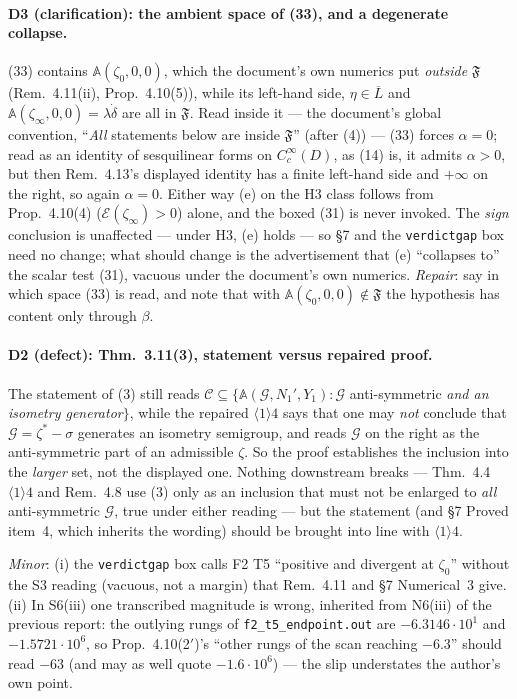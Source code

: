 \documentclass[11pt]{article}
\newcommand{\Aop}{\mathbb A}
\begin{document}
\paragraph{D3 (clarification): the ambient space of (33), and a degenerate collapse.}
(33) contains $\Aop(\zeta_0,0,0)$, which the document's own numerics put \emph{outside}
$\mathfrak F$ (Rem.~4.11(ii), Prop.~4.10(5)), while its left-hand side, $\eta\in\overline L$
and $\Aop(\zeta_\infty,0,0)=\lambda\dot\delta$ are all in $\mathfrak F$.  Read inside it --- the
document's global convention, ``\emph{All} statements below are inside $\mathfrak F$'' (after
(4)) --- (33) forces $\alpha=0$; read as an identity of sesquilinear forms on $C_c^\infty(D)$,
as (14) is, it admits $\alpha>0$, but then Rem.~4.13's displayed identity has a finite
left-hand side and $+\infty$ on the right, so again $\alpha=0$.  Either way (e) on the H3
class follows from Prop.~4.10(4) ($\mathcal E(\zeta_\infty)>0$) alone, and the boxed (31) is
never invoked.  The \emph{sign} conclusion is unaffected --- under H3, (e) holds --- so \S7
and the \texttt{verdictgap} box need no change; what should change is the advertisement that
(e) ``collapses to'' the scalar test (31), vacuous under the document's own numerics.
\emph{Repair}: say in which space (33) is read, and note that with
$\Aop(\zeta_0,0,0)\notin\mathfrak F$ the hypothesis has content only through $\beta$.

\paragraph{D2 (defect): Thm.~3.11(3), statement versus repaired proof.}  The statement of
(3) still reads $\mathcal C\subseteq\{\Aop(\mathcal G,N_1',Y_1):\mathcal G$ anti-symmetric
\emph{and an isometry generator}$\}$, while the repaired $\langle1\rangle4$ says that one
may \emph{not} conclude that $\mathcal G=\zeta^*-\sigma$ generates an isometry semigroup, and
reads $\mathcal G$ on the right as the anti-symmetric part of an admissible $\zeta$.  So the
proof establishes the inclusion into the \emph{larger} set, not the displayed one.  Nothing
downstream breaks --- Thm.~4.4 $\langle1\rangle4$ and Rem.~4.8 use (3) only as an inclusion
that must not be enlarged to \emph{all} anti-symmetric $\mathcal G$, true under either
reading --- but the statement (and \S7 Proved item~4, which inherits the wording) should be
brought into line with $\langle1\rangle4$.

\emph{Minor}: (i) the \texttt{verdictgap} box calls F2 T5 ``positive and divergent at
$\zeta_0$'' without the S3 reading (vacuous, not a margin) that Rem.~4.11 and \S7
Numerical~3 give.  (ii) In S6(iii) one transcribed magnitude is wrong, inherited from N6(iii)
of the previous report: the outlying rungs of \texttt{f2\_t5\_endpoint.out} are
$-6.3146\cdot10^{1}$ and $-1.5721\cdot10^{6}$, so Prop.~4.10(2$'$)'s ``other rungs of the
scan reaching $-6.3$'' should read $-63$ (and may as well quote $-1.6\cdot10^{6}$) --- the
slip understates the author's own point.
\end{document}
